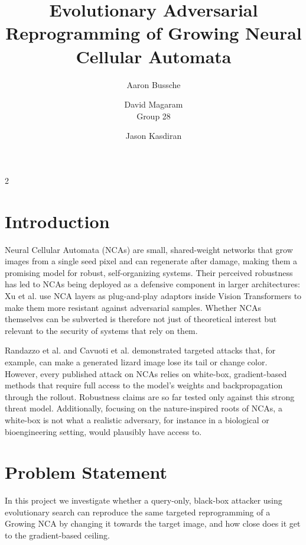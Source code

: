 \documentclass{article}
\title{Evolutionary Adversarial Reprogramming of Growing Neural Cellular Automata}
\author{Aaron Bussche \and  David Magaram\\[0.3em] Group 28 \and Jason Kasdiran}
\begin{document}
	\maketitle
\begin{multicols}{2}
\section*{Introduction}

Neural Cellular Automata (NCAs) are small, shared-weight networks that grow images from a single seed pixel and can regenerate after damage, making them a promising model for robust, self-organizing systems. Their perceived robustness has led to NCAs being deployed as a defensive component in larger architectures: Xu et al. \cite{xu2024adanca} use NCA layers as plug-and-play adaptors inside Vision Transformers to make them more resistant against adversarial samples. Whether NCAs themselves can be subverted is therefore not just of theoretical interest but relevant to the security of systems that rely on them.

Randazzo et al. \cite{randazzo2021adversarial} and Cavuoti et al. \cite{cavuoti2022adversarial} demonstrated targeted attacks that, for example, can make a generated lizard image lose its tail or change color. However, every published attack on NCAs relies on white-box, gradient-based methods that require full access to the model's weights and backpropagation through the rollout. Robustness claims are so far tested only against this strong threat model. Additionally, focusing on the nature-inspired roots of NCAs, a white-box is not what a realistic adversary, for instance in a biological or bioengineering setting, would plausibly have access to.


\section*{Problem Statement}

In this project we investigate whether a query-only, black-box attacker using evolutionary search can reproduce the same targeted reprogramming of a Growing NCA by changing it towards the target image, and how close does it get to the gradient-based ceiling.


\end{multicols}
\end{document}
